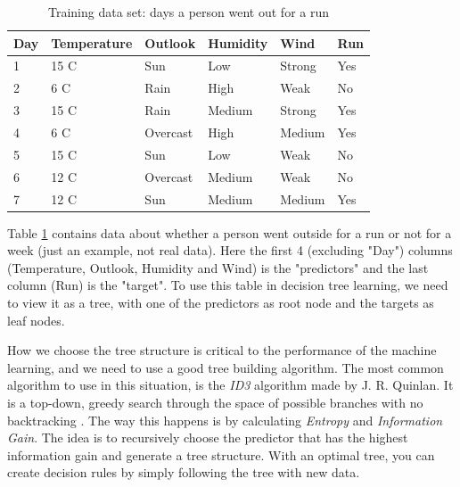 \begin{table}
    \begin{tabular}{| l | l | l | l | l | l |}
    \hline
    \textbf{Day} & \textbf{Temperature} & \textbf{Outlook}   & \textbf{Humidity}  & \textbf{Wind}     & \textbf{Run} \\ \hline
            1    & 15 C                 & Sun                & Low                & Strong            & Yes \\
            2    & 6 C                  & Rain               & High               & Weak              & No  \\
            3    & 15 C                 & Rain               & Medium             & Strong            & Yes \\
            4    & 6 C                  & Overcast           & High               & Medium            & Yes \\
            5    & 15 C                 & Sun                & Low                & Weak              & No  \\
            6    & 12 C                 & Overcast           & Medium             & Weak              & No  \\
            7    & 12 C                 & Sun                & Medium             & Medium            & Yes \\
    \hline
    \end{tabular}
    \caption{Training data set: days a person went out for a run}
    \label{table:days_running}
\end{table}


Table \ref{table:days_running} contains data about whether a person went outside for a run or not for a week (just an example, not real data). 
Here the first 4 (excluding "Day") columns (Temperature, Outlook, Humidity and Wind) is the "predictors" and the last column (Run) is the "target". 
To use this table in decision tree learning, we need to view it as a tree, with one of the predictors as root node and the targets as leaf nodes. 

How we choose the tree structure is critical to the performance of the machine learning, and we need to use a good tree building algorithm. 
The most common algorithm to use in this situation, is the \textit{ID3} algorithm made by J. R. Quinlan. It is a top-down, 
greedy search through the space of possible branches with no backtracking \cite{decision_tree}. The way this happens is by calculating \textit{Entropy} 
and \textit{Information Gain}. The idea is to recursively choose the predictor that has the highest information gain and generate a tree structure.
With an optimal tree, you can create decision rules by simply following the tree with new data.

